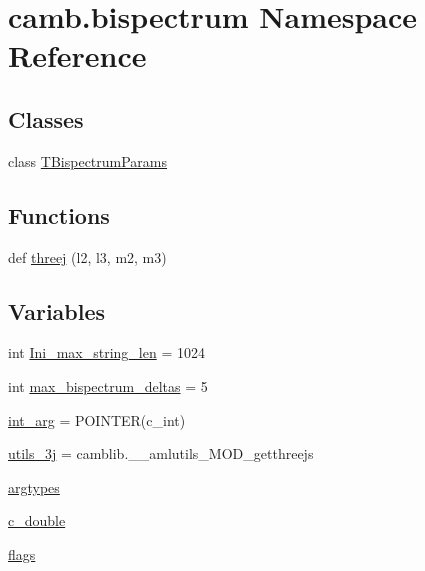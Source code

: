 \hypertarget{namespacecamb_1_1bispectrum}{}\section{camb.\+bispectrum Namespace Reference}
\label{namespacecamb_1_1bispectrum}
\subsection*{Classes}
\begin{DoxyCompactItemize}
\item 
class \mbox{\hyperlink{classcamb_1_1bispectrum_1_1TBispectrumParams}{T\+Bispectrum\+Params}}
\end{DoxyCompactItemize}
\subsection*{Functions}
\begin{DoxyCompactItemize}
\item 
def \mbox{\hyperlink{namespacecamb_1_1bispectrum_acfd276a5fe55c730d0e6894102263d26}{threej}} (l2, l3, m2, m3)
\end{DoxyCompactItemize}
\subsection*{Variables}
\begin{DoxyCompactItemize}
\item 
int \mbox{\hyperlink{namespacecamb_1_1bispectrum_a08f91bdfd605316168c6f9945e231537}{Ini\+\_\+max\+\_\+string\+\_\+len}} = 1024
\item 
int \mbox{\hyperlink{namespacecamb_1_1bispectrum_acfb296b835d08e3b7adc2f522b55adfc}{max\+\_\+bispectrum\+\_\+deltas}} = 5
\item 
\mbox{\hyperlink{namespacecamb_1_1bispectrum_aa993aee77d2c97cda3541c80dbb40ec3}{int\+\_\+arg}} = P\+O\+I\+N\+T\+ER(c\+\_\+int)
\item 
\mbox{\hyperlink{namespacecamb_1_1bispectrum_a01b9e7316197b6f732d61344237b5daf}{utils\+\_\+3j}} = camblib.\+\_\+\+\_\+amlutils\+\_\+\+M\+O\+D\+\_\+getthreejs
\item 
\mbox{\hyperlink{namespacecamb_1_1bispectrum_a0201f75585677da352aea867ea3ae446}{argtypes}}
\item 
\mbox{\hyperlink{namespacecamb_1_1bispectrum_a20505d8d175bf2e5e275fc0f5c13e027}{c\+\_\+double}}
\item 
\mbox{\hyperlink{namespacecamb_1_1bispectrum_ab363e13d379e3fdadc85c87126a14687}{flags}}
\end{DoxyCompactItemize}


